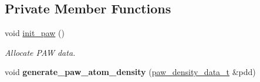 \subsection*{Private Member Functions}
\begin{DoxyCompactItemize}
\item 
void \hyperlink{classsirius_1_1_density_a67328cc11d444a56f5557a6c05ef4aab}{init\+\_\+paw} ()
\begin{DoxyCompactList}\small\item\em Allocate P\+A\+W data. \end{DoxyCompactList}\item 
\hypertarget{classsirius_1_1_density_a83cf34e3ebef152492c5c1527379a7ad}{}void {\bfseries generate\+\_\+paw\+\_\+atom\+\_\+density} (\hyperlink{structsirius_1_1_density_1_1paw__density__data__t}{paw\+\_\+density\+\_\+data\+\_\+t} \&pdd)\label{classsirius_1_1_density_a83cf34e3ebef152492c5c1527379a7ad}


\end{DoxyCompactItemize}
